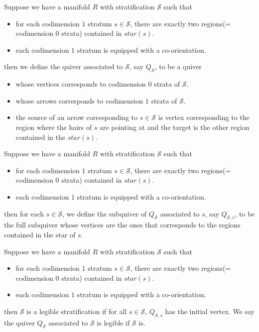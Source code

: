 \begin{definition}
Suppose we have a manifold $R$ with stratification $\mathcal{S}$ such that
\begin{itemize}
\item for each codimension $1$ stratum $s\in \mathcal{S}$, there are exactly two regions(= codimension $0$ strata) contained in $star(s)$.

\item each codimension $1$ stratum is equipped with a co-orientation.
\end{itemize}
then we define the quiver associated to $\mathcal{S}$, say $Q_{\mathcal{S}}$, to be a quiver
\begin{itemize}
\item whose vertices corresponds to codimension $0$ strata of $\mathcal{S}$.

\item whose arrows corresponds to codimension $1$ strata of $\mathcal{S}$.

\item the source of an arrow corresponding to $s\in \mathcal{S}$ is  vertex corresponding to the region where the hairs of $s$ are pointing at and the target is the other region contained in the $star(s)$.
\end{itemize}
\end{definition}

\begin{definition}
Suppose we have a manifold $R$ with stratification $\mathcal{S}$ such that
\begin{itemize}
\item for each codimension $1$ stratum $s\in \mathcal{S}$, there are exactly two regions(= codimension $0$ strata) contained in $star(s)$.

\item each codimension $1$ stratum is equipped with a co-orientation.
\end{itemize}
then for each $s\in \mathcal{S}$, we define the subquiver of $Q_{\mathcal{S}}$ associated to $s$, say $Q_{\mathcal{S},s}$, to be the full subquiver whose vertices are the ones that corresponds to the regions contained in the star of $s$.
\end{definition}

\begin{definition}
Suppose we have a manifold $R$ with stratification $\mathcal{S}$ such that
\begin{itemize}
\item for each codimension $1$ stratum $s\in \mathcal{S}$, there are exactly two regions(= codimension $0$ strata) contained in $star(s)$.

\item each codimension $1$ stratum is equipped with a co-orientation.
\end{itemize}
then $\mathcal{S}$ is a legible stratification if for all $s\in\mathcal{S}$, $Q_{\mathcal{S},s}$ has the initial vertex. We say the quiver $Q_{\mathcal{S}}$ associated to $\mathcal{S}$ is legible if $\mathcal{S}$ is.
\end{definition}

